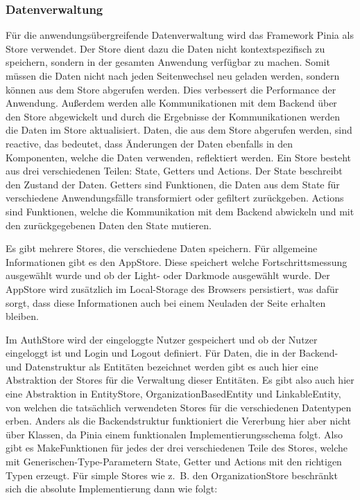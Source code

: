 \subsubsection{Datenverwaltung}
Für die anwendungsübergreifende Datenverwaltung wird das Framework Pinia als Store verwendet. Der Store dient dazu die Daten nicht kontextspezifisch zu speichern, sondern in der gesamten Anwendung verfügbar zu machen. Somit müssen die Daten nicht nach jeden Seitenwechsel neu geladen werden, sondern können aus dem Store abgerufen werden. Dies verbessert die Performance der Anwendung. Außerdem werden alle Kommunikationen mit dem Backend über den Store abgewickelt und durch die Ergebnisse der Kommunikationen werden die Daten im Store aktualisiert. Daten, die aus dem Store abgerufen werden, sind reactive, das bedeutet, dass Änderungen der Daten ebenfalls in den Komponenten, welche die Daten verwenden, reflektiert werden. Ein Store besteht aus drei verschiedenen Teilen: State, Getters und Actions. Der State beschreibt den Zustand der Daten. Getters sind Funktionen, die Daten aus dem State für verschiedene Anwendungsfälle transformiert oder gefiltert zurückgeben. Actions sind Funktionen, welche die Kommunikation mit dem Backend abwickeln und mit den zurückgegebenen Daten den State mutieren.

Es gibt mehrere Stores, die verschiedene Daten speichern. Für allgemeine Informationen gibt es den AppStore. Diese speichert welche Fortschrittsmessung ausgewählt wurde und ob der Light- oder Darkmode ausgewählt wurde. Der AppStore wird zusätzlich im Local-Storage des Browsers persistiert, was dafür sorgt, dass diese Informationen auch bei einem Neuladen der Seite erhalten bleiben.

Im AuthStore wird der eingeloggte Nutzer gespeichert und ob der Nutzer eingeloggt ist und Login und Logout definiert.
Für Daten, die in der Backend- und Datenstruktur als Entitäten bezeichnet werden gibt es auch hier eine Abstraktion der Stores für die Verwaltung dieser Entitäten. Es gibt also auch hier eine Abstraktion in EntityStore, OrganizationBasedEntity und LinkableEntity, von welchen die tatsächlich verwendeten Stores für die verschiedenen Datentypen erben. Anders als die Backendstruktur funktioniert die Vererbung hier aber nicht über Klassen, da Pinia einem funktionalen Implementierungsschema folgt. Also gibt es MakeFunktionen für jedes der drei verschiedenen Teile des Stores, welche mit Generischen-Type-Parametern State, Getter und Actions mit den richtigen Typen erzeugt. Für simple Stores wie z. B. den OrganizationStore beschränkt sich die absolute Implementierung dann wie folgt:

